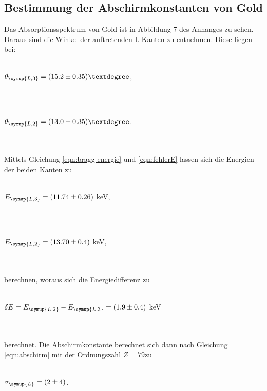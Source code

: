         \subsection{Bestimmung der Abschirmkonstanten von Gold}
        Das Absorptionsspektrum von Gold ist in Abbildung 7 des Anhanges zu sehen. Daraus sind die Winkel der auftretenden L-Kanten zu entnehmen.
        Diese liegen bei:
        \\ \\
        \centerline{$\theta_{\symup{L,3}} = (15.2 \pm 0.35)°$,}
        \\ \\
        \centerline{$\theta_{\symup{L,2}} = (13.0 \pm 0.35)°$.}
        \\ \\
        Mittels Gleichung \eqref{eqn:bragg-energie} und \eqref{eqn:fehlerE} lassen sich die Energien der beiden Kanten zu
        \\ \\
        \centerline{$E_{\symup{L,3}} = (11.74 \pm 0.26)$ keV,}
        \\ \\
        \centerline{$E_{\symup{L,2}} = (13.70 \pm 0.4)$ keV,}
        \\ \\
        berechnen, woraus sich die Energiedifferenz zu
        \\ \\
        \centerline{$\delta E = E_{\symup{L,2}} - E_{\symup{L,3}} = (1.9 \pm 0.4)$ keV}
        \\ \\
        berechnet. Die Abschirmkonstante berechnet sich dann nach Gleichung \eqref{eqn:abschirm} mit der Ordnungszahl $Z = 79$zu 
        \\ \\
        \centerline{$\sigma_{\symup{L}} = (2 \pm 4)$.}
        \\ \\
        



